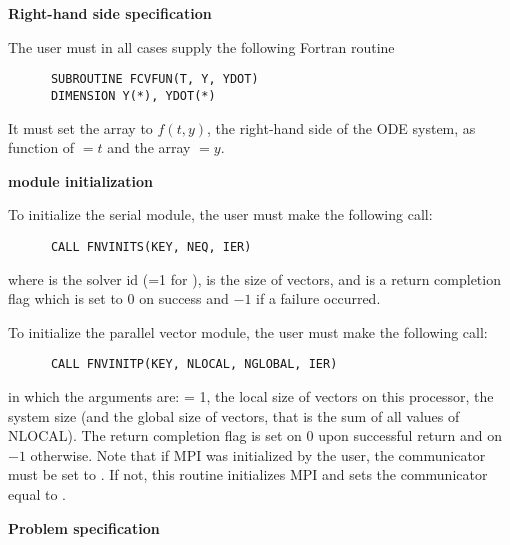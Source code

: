\begin{Steps}
  
\item {\bf Right-hand side specification}
  
  The user must in all cases supply the following Fortran routine
\begin{verbatim}
      SUBROUTINE FCVFUN(T, Y, YDOT)
      DIMENSION Y(*), YDOT(*)
\end{verbatim}
  It must set the  array to $f(t,y)$, the right-hand side of the ODE
  system, as function of $=t$ and the array $=y$.  
  
\item  {\bf {\nvector} module initialization}

  {\s} To initialize the serial {\nvector} module, the user must make the
  following call:
\begin{verbatim}
      CALL FNVINITS(KEY, NEQ, IER)
\end{verbatim}
  where 
   is the solver id (=1 for {\cvode}),
   is the size of vectors, and
   is a  return completion flag which is set to $0$ on success and $-1$ 
  if a failure occurred.
  
  {\p} To initialize the parallel vector module, the user must make the
  following call:
\begin{verbatim}
      CALL FNVINITP(KEY, NLOCAL, NGLOBAL, IER)
\end{verbatim}
  in which the arguments are:  = 1,  the local size of vectors on this
  processor,  the system size (and the global size of vectors, that
  is the sum of all values of NLOCAL). The return completion flag  is
  set on $0$ upon successful return and on $-1$ otherwise.
  Note that if MPI was initialized by the user, the communicator must be
  set to .  If not, this routine initializes MPI and sets
  the communicator equal to .
  
\item {\bf Problem specification}


\end{Steps}
